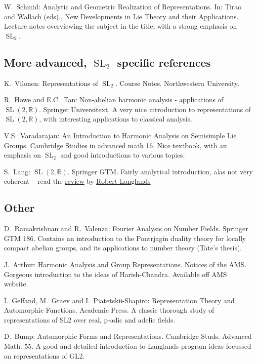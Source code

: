 \documentclass[11pt,leqno]{article}
\theoremstyle{plain}
\theoremstyle{definition}
\numberwithin{equation}{section}
\numberwithin{lem}{section}
\DeclareMathOperator{\SL}{SL}
\begin{document}
{W.~Schmid: Analytic and Geometric Realization of Representations. In: Tirao and Wallach (eds)., New Developments in Lie Theory and their Applications. Lecture notes overviewing the subject in the title, with a strong emphasis on $\SL_2$.
\subsection*{\hspace{1em}More advanced, $\SL_2$ specific references}
K.~Vilonen: Representations of $\SL_2$. Course Notes, Northwestern University.

R.~Howe and E.C.~Tan: Non-abelian harmonic analysis - applications of $\SL(2,\mathbb R)$. Springer Universitext. A very nice introduction to representations of $\SL(2,\mathbb R)$, with interesting applications to classical analysis.

V.S.~Varadarajan: An Introduction to Harmonic Analysis on Semisimple Lie Groups. Cambridge Studies in advanced math 16. Nice textbook, with an emphasis on $\SL_2$ and good introductions to various topics.

S.~Lang: $\SL(2,\mathbb R)$. Springer GTM. Fairly analytical introduction, alas not very coherent -- read the \href{http://www.sunsite.ubc.ca/DigitalMathArchive/Langlands/miscellaneous.html#lang}{review} by \href{http://www.sunsite.ubc.ca/DigitalMathArchive/Langlands}{Robert Langlands}
\subsection*{\hspace{1em}Other}
D.~Ramakrishnan and R.~Valenza: Fourier Analysis on Number Fields. Springer GTM 186. Contains an introduction to the Pontrjagin duality theory for locally compact abelian groups, and its applications to number theory (Tate's thesis).

J.~Arthur: Harmonic Analysis and Group Representations. Notices of the AMS. Gorgeous introduction to the ideas of Harish-Chandra. Available off AMS website.

I.~Gelfand, M.~Graev and I.~Piatetskii-Shapiro: Representation Theory and Automorphic Functions. Academic Press. A classic thorough study of representations of SL2 over real, p-adic and adelic fields.

D.~Bump: Automorphic Forms and Representations. Cambridge Studs. Advanced Math. 55. A good and detailed introduction to Langlands program ideas focussed on representations of GL2.

}
\end{document}

